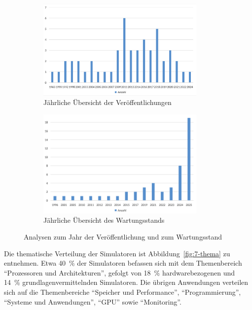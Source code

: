 \begin{figure}[!htbp]
    \centering
    \begin{subfigure}[b]{0.48\textwidth}
        \centering
        \includegraphics[width=0.90\textwidth]{graphics_sim/1-anzahl-jahr.png}
        \caption{Jährliche Übersicht der Veröffentlichungen}
        \label{fig:1-anzahl-jahr}
    \end{subfigure}
    \hfill
    \begin{subfigure}[b]{0.48\textwidth}
        \centering
        \includegraphics[width=0.90\textwidth]{graphics_sim/2-veroeffentlichung.png}
        \caption{Jährliche Übersicht des Wartungsstands}
        \label{fig:2-veroeffentlichungen}
    \end{subfigure}
    \caption{Analysen zum Jahr der Veröffentlichung und zum Wartungsstand}
    \label{fig:veroeffentlichung_wartungsstand}
\end{figure}

Die thematische Verteilung der Simulatoren ist Abbildung~\ref{fig:7-thema} zu entnehmen. Etwa 40~\% der Simulatoren befassen sich mit dem Themenbereich \enquote{Prozessoren und Architekturen}, gefolgt von 18~\% hardwarebezogenen und 14~\% grundlagenvermittelnden Simulatoren. Die übrigen Anwendungen verteilen sich auf die Themenbereiche \enquote{Speicher und Performance}, \enquote{Programmierung}, \enquote{Systeme und Anwendungen}, \enquote{GPU} sowie \enquote{Monitoring}.

